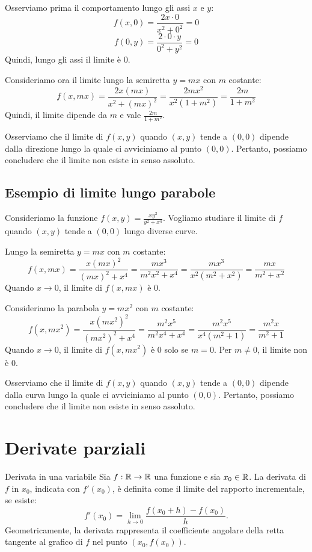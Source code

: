 Osserviamo prima il comportamento lungo gli assi $x$ e $y$:
\[
f(x,0) = \frac{2x \cdot 0}{x^2 + 0^2} = 0
\]
\[
f(0,y) = \frac{2 \cdot 0 \cdot y}{0^2 + y^2} = 0
\]
Quindi, lungo gli assi il limite è $0$.

Consideriamo ora il limite lungo la semiretta $y=mx$ con $m$ costante:
\[
f(x,mx) = \frac{2x(mx)}{x^2+(mx)^2} = \frac{2mx^2}{x^2(1+m^2)} = \frac{2m}{1+m^2}
\]
Quindi, il limite dipende da $m$ e vale $\frac{2m}{1+m^2}$.

Osserviamo che il limite di $f(x,y)$ quando $(x,y)$ tende a $(0,0)$ dipende dalla direzione lungo la quale ci avviciniamo al punto $(0,0)$. Pertanto, possiamo concludere che il limite non esiste in senso assoluto.

\subsection{Esempio di limite lungo parabole}
Consideriamo la funzione $f(x,y)= \frac{xy^2}{y^2+x^4}$. Vogliamo studiare il limite di $f$ quando $(x,y)$ tende a $(0,0)$ lungo diverse curve.

Lungo la semiretta $y=mx$ con $m$ costante:
\[
f(x,mx) = \frac{x(mx)^2}{(mx)^2+x^4} = \frac{mx^3}{m^2x^2+x^4} = \frac{mx^3}{x^2(m^2+x^2)} = \frac{mx}{m^2+x^2}
\]
Quando $x \to 0$, il limite di $f(x,mx)$ è $0$.

Consideriamo la parabola $y=mx^2$ con $m$ costante:
\[
f(x,mx^2) = \frac{x(mx^2)^2}{(mx^2)^2+x^4} = \frac{m^2x^5}{m^2x^4+x^4} = \frac{m^2x^5}{x^4(m^2+1)} = \frac{m^2x}{m^2+1}
\]
Quando $x \to 0$, il limite di $f(x,mx^2)$ è $0$ solo se $m=0$. Per $m \neq 0$, il limite non è $0$.

Osserviamo che il limite di $f(x,y)$ quando $(x,y)$ tende a $(0,0)$ dipende dalla curva lungo la quale ci avviciniamo al punto $(0,0)$. Pertanto, possiamo concludere che il limite non esiste in senso assoluto.

\section{Derivate parziali}
\begin{definizione}{Derivata in una variabile}
Sia $f: \mathbb{R} \rightarrow \mathbb{R}$ una funzione e sia $x_0 \in \mathbb{R}$. La derivata di $f$ in $x_0$, indicata con $f'(x_0)$, è definita come il limite del rapporto incrementale, se esiste:
$$f'(x_0) = \lim_{h \to 0} \frac{f(x_0 + h) - f(x_0)}{h}.$$
Geometricamente, la derivata rappresenta il coefficiente angolare della retta tangente al grafico di $f$ nel punto $(x_0, f(x_0))$.
\end{definizione}

